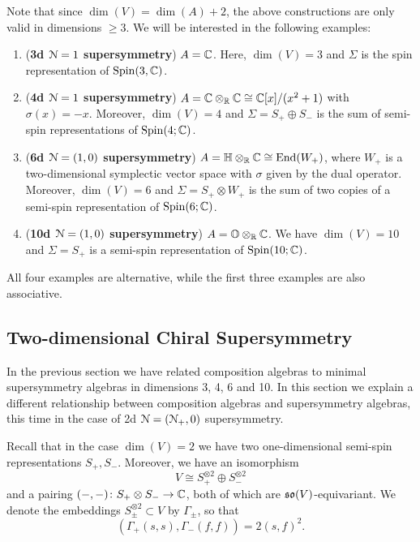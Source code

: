 \documentclass[10pt, oneside]{article}
\begin{document}
Note that since $\dim(V) = \dim(A) + 2$, the above constructions are only valid in dimensions $\geq 3$.
We will be interested in the following examples:
\begin{enumerate}
\item (\textbf{3d $\mathcal{N}=1$ supersymmetry}) $A = \mathbb C$. 
Here, $\dim(V) = 3$ and $\Sigma$ is the spin representation of $\mathrm{Spin}(3, \mathbb C)$.

\item (\textbf{4d $\mathcal{N}=1$ supersymmetry}) $A = \mathbb C\otimes_{\mathbb R}\mathbb C\cong \mathbb C[x]/(x^2+1)$ with $\sigma(x) = -x$. Moreover, $\dim(V) = 4$ and $\Sigma=S_+\oplus S_-$ is the sum of semi-spin representations of $\mathrm{Spin}(4;\mathbb C)$.

\item (\textbf{6d $\mathcal{N}=(1, 0)$ supersymmetry}) $A=\mathbb{H}\otimes_{\mathbb R}\mathbb C\cong \operatorname{End}(W_+)$, where $W_+$ is a two-dimensional symplectic vector space with $\sigma$ given by the dual operator. Moreover, $\dim(V) = 6$ and $\Sigma = S_+\otimes W_+$ is the sum of two copies of a semi-spin representation of $\mathrm{Spin}(6;\mathbb C)$.

\item (\textbf{10d $\mathcal{N}=(1, 0)$ supersymmetry}) $A=\mathbb{O}\otimes_{\mathbb R}\mathbb C$. We have $\dim(V) = 10$ and $\Sigma = S_+$ is a semi-spin representation of $\mathrm{Spin}(10;\mathbb C)$.
\end{enumerate}

All four examples are alternative, while the first three examples are also associative.

\subsection{Two-dimensional Chiral Supersymmetry} \label{sect:2dchiral}

In the previous section we have related composition algebras to minimal supersymmetry algebras in dimensions 3, 4, 6 and 10. 
In this section we explain a different relationship between composition algebras and supersymmetry algebras, this time in the case of 2d $\mathcal N=(\mathcal N_+, 0)$ supersymmetry.

Recall that in the case $\dim(V) = 2$ we have two one-dimensional semi-spin representations $S_+, S_-$. Moreover, we have an isomorphism
\[V\cong S_+^{\otimes 2}\oplus S_-^{\otimes 2}\]
and a pairing $( -, -)\colon S_+\otimes S_-\rightarrow \mathbb C$, both of which are $\mathfrak{so}(V)$-equivariant. We denote the embeddings $S_{\pm}^{\otimes 2}\subset V$ by $\Gamma_{\pm}$, so that
\begin{equation}
(\Gamma_+(s, s), \Gamma_-(f, f)) = 2(s, f)^2.
\label{eq:2dvectorpairing}
\end{equation}
\end{document}
